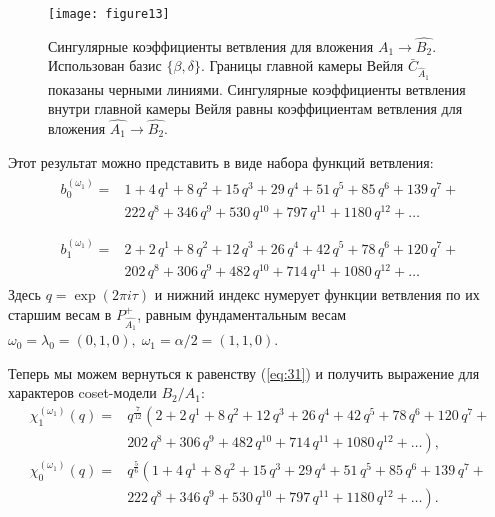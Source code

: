 \begin{figure}[tb]
  \centering
  \texttt{[image: figure13]}
  \caption{Сингулярные коэффициенты ветвления для вложения $\hat{A_1}\rightarrow \hat{B_2}$. Использован базис $\{\beta,\delta\}$. Границы главной камеры Вейля $\bar{C}_{\hat{A}_1}$ показаны черными линиями. Сингулярные коэффициенты ветвления внутри главной камеры Вейля равны коэффициентам ветвления для вложения $\hat{A_1}\rightarrow \hat{B_2}$.}
  \label{fig:AffineB2_A1_branching}
\end{figure}

Этот результат можно представить в виде набора функций ветвления:
\begin{eqnarray*}
  \label{eq:29}
  \begin{array}{cc}
    b^{(\omega_1)}_{0}= & 1 + 4\,q^{1}+ 8\,q^{2}+ 15\,q^{3}+ 29\,q^{4}+ 51\,q^{5}+ 85\,q^{6}+ 139\,q^{7}+\\
     &222\,q^{8}+ 346\,q^{9}+ 530\,q^{10}+ 797\,q^{11}+ 1180\,q^{12}+\dots\\
  \end{array}\\
  \begin{array}{cc}
    b^{(\omega_1)}_{1}= &2+2\,q^{1}+8\,q^{2}+12\,q^{3}+26\,q^{4}+42\,q^{5}+78\,q^{6}+120\,q^{7}+\\
    & 202\,q^{8}+306\,q^{9}+482\,q^{10}+714\,q^{11}+1080\,q^{12}+\dots
  \end{array}
\end{eqnarray*}
Здесь $q=\exp (2\pi i \tau)$ и нижний индекс нумерует функции ветвления по их старшим весам в  $P^+_{\hat{A_1}}$, равным фундаментальным весам $\omega_0=\lambda_0=(0,1,0),\; \omega_1=\alpha/2=(1,1,0)$.

Теперь мы можем вернуться к равенству (\ref{eq:31}) и получить выражение для характеров coset-модели $B_2/A_1$:
\begin{equation*}
  \label{eq:35}
  \begin{array}{cc}
    \chi^{(\omega_1)}_{1}(q)= & q^{\frac{7}{12}}\left( 2+2\,q^{1}+8\,q^{2}+12\,q^{3}+26\,q^{4}+42\,q^{5}+78\,q^{6}+120\,q^{7}+\right. \\
    & \left. 202\,q^{8}+306\,q^{9}+482\,q^{10}+714\,q^{11}+1080\,q^{12}+\dots \right),\\
    \chi^{(\omega_1)}_{0}(q) = & q^{\frac{5}{6}}\left(1 + 4\,q^{1}+ 8\,q^{2}+ 15\,q^{3}+ 29\,q^{4}+ 51\,q^{5}+ 85\,q^{6}+ 139\,q^{7}+\right. \\
    &\left. 222\,q^{8}+ 346\,q^{9}+ 530\,q^{10}+ 797\,q^{11}+ 1180\,q^{12}+\dots\right).
  \end{array}
\end{equation*}

